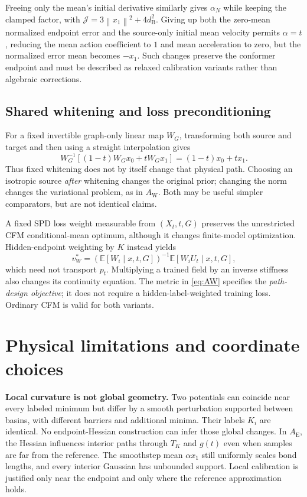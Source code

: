 \documentclass[11pt,letterpaper]{article}
\newcommand{\E}{\mathbb E}
\newcommand{\norm}[1]{\left\lVert#1\right\rVert}
\newcommand{\bures}{d_{\mathrm B}}
\newcommand{\AltE}{A_{\mathrm E}}
\newcommand{\AltW}{A_{\mathrm W}}
\newcommand{\J}{\mathcal J}
\begin{document}
Freeing only the mean's initial derivative similarly gives $\alpha_N$ while keeping the clamped factor, with $\J=3\norm{x_1}^2+4\bures^2$. Giving up both the zero-mean normalized endpoint error and the source-only initial mean velocity permits $\alpha=t$, reducing the mean action coefficient to $1$ and mean acceleration to zero, but the normalized error mean becomes $-x_1$. Such changes preserve the conformer endpoint and must be described as relaxed calibration variants rather than algebraic corrections.

\subsection{Shared whitening and loss preconditioning}
For a fixed invertible graph-only linear map $W_G$, transforming both source and target and then using a straight interpolation gives
\begin{equation}
W_G^{-1}[(1-t)W_Gx_0+tW_Gx_1]=(1-t)x_0+tx_1.
\end{equation}
Thus fixed whitening does not by itself change that physical path. Choosing an isotropic source \emph{after} whitening changes the original prior; changing the norm changes the variational problem, as in $\AltW$. Both may be useful simpler comparators, but are not identical claims.

A fixed SPD loss weight measurable from $(X_t,t,G)$ preserves the unrestricted CFM conditional-mean optimum, although it changes finite-model optimization. Hidden-endpoint weighting by $K$ instead yields
\begin{equation}
v_W^*=(\E[W_i\mid x,t,G])^{-1}\E[W_iU_t\mid x,t,G],
\end{equation}
which need not transport $p_t$. Multiplying a trained field by an inverse stiffness also changes its continuity equation. The metric in \eqref{eq:AW} specifies the \emph{path-design objective}; it does not require a hidden-label-weighted training loss. Ordinary CFM is valid for both variants.

\section{Physical limitations and coordinate choices}
\label{sec:limitations}

\textbf{Local curvature is not global geometry.} Two potentials can coincide near every labeled minimum but differ by a smooth perturbation supported between basins, with different barriers and additional minima. Their labels $K_i$ are identical. No endpoint-Hessian construction can infer those global changes. In $\AltE$, the Hessian influences interior paths through $T_K$ and $g(t)$ even when samples are far from the reference. The smoothstep mean $\alpha x_1$ still uniformly scales bond lengths, and every interior Gaussian has unbounded support. Local calibration is justified only near the endpoint and only where the reference approximation holds.
\end{document}
